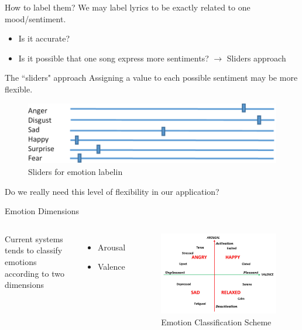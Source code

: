 \documentclass[xcolor=dvipsnames]{beamer}
\begin{document}
\begin{frame}{How to label them?}
We may label lyrics to be exactly related to one mood/sentiment.
\begin{itemize}
\item Is it accurate?
\item Is it possible that one song express more sentiments? $\rightarrow$ Sliders approach
\end{itemize}
\end{frame}

\begin{frame}{The ``sliders" approach}
Assigning a value to each possible sentiment may be more flexible.
\begin{figure}
	\centering
	\includegraphics[scale=0.35]{./images/emotion_labeling_sliders}
	\caption{Sliders for emotion labelin}
\end{figure}
Do we really need this level of flexibility in our application?
\end{frame}

\begin{frame}{Emotion Dimensions}
\begin{columns}
Current systems tends to classify emotions according to two dimensions
\begin{itemize}
\item Arousal
\item Valence
\end{itemize}
\begin{figure}
	\centering
	\includegraphics[scale=0.3]{./images/emotion-dimensions}
	\caption{Emotion Classification Scheme}
\end{figure}
\end{columns}
\end{frame}
\end{document}
